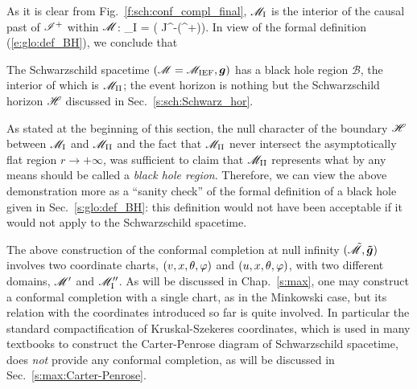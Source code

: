 As it is clear from Fig.~\ref{f:sch:conf_compl_final}, $\mathscr{M}_{\rm I}$
is the interior of the causal past of $\mathscr{I}^+$ within $\mathscr{M}$:
\be
    \M_{\rm I} = \left( J^-(\scri^+)\cap\M \right).
\ee
In view of the formal definition (\ref{e:glo:def_BH}), we conclude that
\begin{greybox}
The Schwarzschild spacetime $(\mathscr{M}=\mathscr{M}_{\rm IEF}, \bm{g})$
has a black hole region $\mathscr{B}$, the interior
of which is $\mathscr{M}_{\rm II}$; the event horizon is nothing but the
Schwarzschild horizon $\mathscr{H}$ discussed in Sec.~\ref{s:sch:Schwarz_hor}.
\end{greybox}

\begin{remark}
As stated at the beginning of this section, the null character of the boundary
$\mathscr{H}$ between $\mathscr{M}_{\rm I}$ and $\mathscr{M}_{\rm II}$ and the fact that
$\mathscr{M}_{\rm II}$ never intersect the asymptotically flat region $r\rightarrow +\infty$,
was sufficient to claim that $\mathscr{M}_{\rm II}$ represents what by any means should be
called a \emph{black hole region}.
Therefore, we can view the above demonstration more as a ``sanity check''
of the formal definition of a black hole given in Sec.~\ref{s:glo:def_BH}:
this definition would not have been acceptable if it would not
apply to the Schwarzschild spacetime.
\end{remark}

\begin{remark}
The above construction of the conformal completion at null infinity
$(\tilde{\mathscr{M}},\bm{\tilde{g}})$ involves two coordinate charts,
$(v,x,\theta,\varphi)$ and $(u,x,\theta,\varphi)$, with two different
domains, $\mathscr{M}'$ and $\mathscr{M}''_{\rm I}$.
As will be discussed in Chap.~\ref{s:max},
one may construct a conformal completion
with a single chart, as in the Minkowski case, but its relation with
the coordinates introduced so far is quite involved.
In particular the standard compactification of Kruskal-Szekeres coordinates,
which is used in many textbooks to construct the Carter-Penrose diagram
of Schwarzschild spacetime, does \emph{not} provide any
conformal completion, as will be discussed in
Sec.~\ref{s:max:Carter-Penrose}.
\end{remark}



